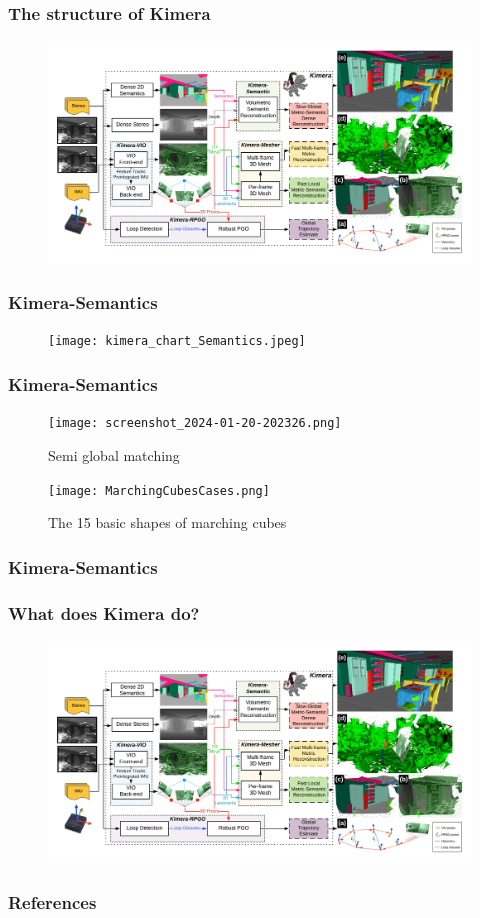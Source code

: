 \documentclass[11pt]{beamer}
\begin{document}
\begin{frame}
\frametitle{The structure of Kimera}
\begin{figure}
    \includegraphics[width=\linewidth]{kimera_chart_23.jpeg} 
\end{figure}
\end{frame}
\begin{frame}
\frametitle{Kimera-Semantics}
\begin{figure}
    \texttt{[image: kimera\_chart\_Semantics.jpeg]} 
\end{figure}
\end{frame}
\begin{frame}
\frametitle{Kimera-Semantics}
\begin{figure}
    \texttt{[image: screenshot\_2024-01-20-202326.png]} 
    \caption{Semi global matching \cite{SGM}}
\end{figure}
\begin{figure}
    \texttt{[image: MarchingCubesCases.png]} 
    \caption{The 15 basic shapes of marching cubes \cite{marchingCubesImage} }
\end{figure}
\end{frame}
\begin{frame}
\frametitle{Kimera-Semantics}
    \begin{figure}[ht]
        \centering
    \end{figure}
\end{frame}
\begin{frame}
\frametitle{What does Kimera do?}
\begin{figure}
    \includegraphics[width=\linewidth]{kimera_chart_23.jpeg} 
\end{figure}
\end{frame}
\begin{frame}[allowframebreaks]
\footnotesize
  \frametitle{References}
  
{}
\end{frame}
\end{document}
